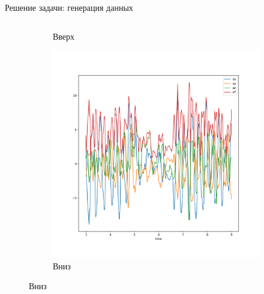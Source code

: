 \documentclass{beamer}
\begin{document}
\begin{frame}{Решение задачи: генерация данных}
\begin{columns}
\begin{column}{.6\textwidth}
\begin{figure}
\begin{subfigure}[b]{0.48\textwidth}
                    \caption{Вверх}
                \end{subfigure}%
                \begin{subfigure}[b]{0.48\textwidth}
                    \centering
                    \includegraphics[width=\linewidth]{../pics/raw_go_down.png}
                    \caption{Вниз}
                \end{subfigure}

            \end{figure}
        \end{column}%
    \end{columns}
\end{frame}

\end{document}
